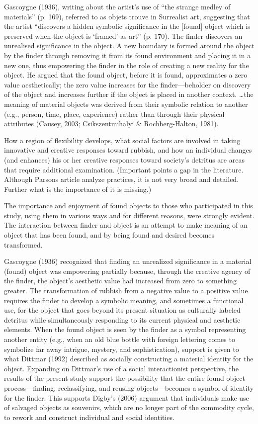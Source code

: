 Gascoygne (1936), writing about the artist’s use of “the strange medley of materials” (p. 169), referred to as objets trouve in Surrealist art, suggesting that the artist “discovers a hidden symbolic significance in the [found] object which is preserved when the object is ‘framed’ as art” (p. 170). The finder discovers an unrealised significance in the object. A new boundary is formed around the object by the finder through removing it from its found environment and placing it in a new one, thus empowering the finder in the role of creating a new reality for the object. He argued that the found object, before it is found, approximates a zero value aesthetically; the zero value increases for the finder---beholder on discovery of the object and increases further if the object is placed in another context. \ldots the meaning of material objects was derived from their symbolic relation to another (e.g., person, time, place, experience) rather than through their physical attributes (Causey, 2003; Csikszentmihalyi \& Rochberg-Halton, 1981). 

How a region of flexibility develops, what social factors are involved in taking innovative and creative responses toward rubbish, and how an individual changes (and enhances) his or her creative responses toward society’s detritus are areas that require additional examination. (Important points a gap in the literature. Although Parsons article analyze practices, it is not very broad and detailed. Further what is the importance of it is missing.)

The importance and enjoyment of found objects to those who participated in this study, using them in various ways and for different reasons, were strongly evident. The interaction between finder and object is an attempt to make meaning of an object that has been found, and by being found and desired becomes transformed.

Gascoygne (1936) recognized that finding an unrealized significance in a material (found) object was empowering partially because, through the creative agency of the finder, the object’s aesthetic value had increased from zero to something greater. The transformation of rubbish from a negative value to a positive value requires the finder to develop a symbolic meaning, and sometimes a functional use, for the object that goes beyond its present situation as culturally labeled detritus while simultaneously responding to its current physical and aesthetic elements. When the found object is seen by the finder as a symbol representing another entity (e.g., when an old blue bottle with foreign lettering comes to symbolize far away intrigue, mystery, and sophistication), support is given to what Dittmar (1992) described as socially constructing a material identity for the object. Expanding on Dittmar’s use of a social interactionist perspective, the results of the present study support the possibility that the entire found object process---finding, reclassifying, and reusing objects---becomes a symbol of identity for the finder. This supports Digby’s (2006) argument that individuals make use of salvaged objects as souvenirs, which are no longer part of the commodity cycle, to rework and construct individual and social identities.

